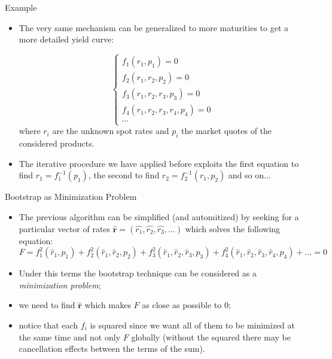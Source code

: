 \documentclass{beamer}
\begin{document}
\begin{frame}[fragile]{Example}
\begin{itemize}
\item The very same mechanism can be generalized to more maturities to get a more detailed yield curve: 
 
\begin{equation*}
 \begin{cases}
 f_1(r_1, p_1) = 0 \\
 f_2(r_1, r_2, p_2) = 0 \\
 f_3(r_1, r_2, r_3, p_3) = 0 \\
 f_4(r_1, r_2, r_3, r_4, p_4) = 0 \\
 \cdots
 \end{cases}
 \end{equation*}
where $r_i$ are the unknown spot rates and $p_i$ the market quotes of the considered products. 
 
 \item The iterative procedure we have applied before exploits the first equation to find $r_1 = f_1^{-1}(p_1)$, the second to find $r_2 = f_2^{-1}(r_1, p_2)$ and so on...
\end{itemize}
\end{frame} 

\begin{frame}{Bootstrap as Minimization Problem}
  \begin{itemize}
    \item The previous algorithm can be simplified (and automitized) by seeking for a particular vector of rates $\mathbf{\hat{r}} = (\hat{r_1}, \hat{r_2}, \hat{r_3},\ldots)$ which solves the following equation:
      \begin{equation}
        F = f_1^2(\hat{r}_1,p_1) + f_2^2(\hat{r}_1, \hat{r}_2,p_2) + f_3^2(\hat{r}_1, \hat{r}_2, \hat{r}_3,p_3) + f_4^2(\hat{r}_1, \hat{r}_2, \hat{r}_3, \hat{r}_4,p_4) + \ldots = 0
      \end{equation}
    \item Under this terms the bootstrap technique can be considered as a \emph{minimization problem};
    \item we need to find $\mathbf{\hat{r}}$ which makes $F$ as close as possible to 0;
    \item notice that each $f_i$ is squared since we want all of them to be minimized at the same time and not only $F$ globally (without the squared there may be cancellation effects between the terms of the sum).
  \end{itemize}
\end{frame}
\end{document}
